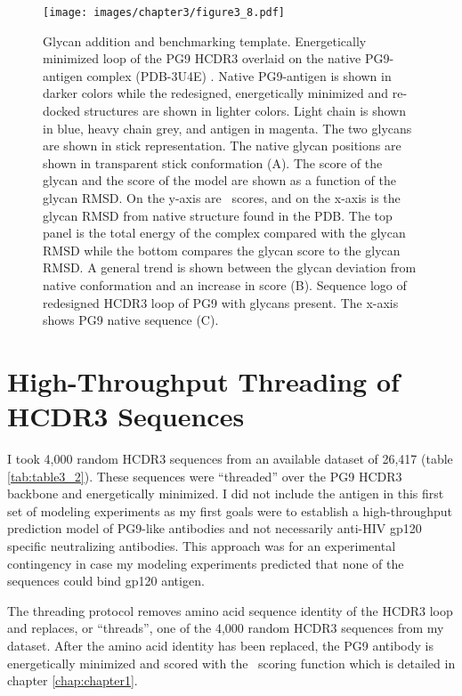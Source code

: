 \begin{figure}[!t]
   \centering
   \texttt{[image: images/chapter3/figure3\_8.pdf]} %
   \caption[Glycan Addition and Benchmarking Template]{Glycan addition and benchmarking template. Energetically minimized loop of the PG9 HCDR3 overlaid on the native PG9-antigen complex (PDB-3U4E) \citep{McLellan:2011dg}. Native PG9-antigen is shown in darker colors while the redesigned, energetically minimized and re-docked structures are shown in lighter colors. Light chain is shown in blue, heavy chain grey, and antigen in magenta. The two glycans are shown in stick representation. The native glycan positions are shown in transparent stick conformation (A). The score of the glycan and the score of the model are shown as a function of the glycan RMSD. On the y-axis are \rosetta~scores, and on the x-axis is the glycan RMSD from native structure found in the PDB. The top panel is the total energy of the complex compared with the glycan RMSD while the bottom compares the glycan score to the glycan RMSD. A general trend is shown between the glycan deviation from native conformation and an increase in score (B). Sequence logo of redesigned HCDR3 loop of PG9 with glycans present. The x-axis shows PG9 native sequence (C).}
   \label{fig:figure3_8}
\end{figure}


\section{High-Throughput Threading of HCDR3 Sequences}
I took 4,000 random HCDR3 sequences from an available dataset of 26,417 (table \ref{tab:table3_2}). These sequences were ``threaded'' over the PG9 HCDR3 backbone and energetically minimized. I did not include the antigen in this first set of modeling experiments as my first goals were to establish a high-throughput prediction model of PG9-like antibodies and not necessarily anti-HIV gp120 specific neutralizing antibodies. This approach was for an experimental contingency in case my modeling experiments predicted that none of the sequences could bind gp120 antigen.

The threading protocol removes amino acid sequence identity of the HCDR3 loop and replaces, or ``threads'', one of the 4,000 random HCDR3 sequences from my dataset. After the amino acid identity has been replaced, the PG9 antibody is energetically minimized and scored with the \rosetta~scoring function which is detailed in chapter \ref{chap:chapter1}.

